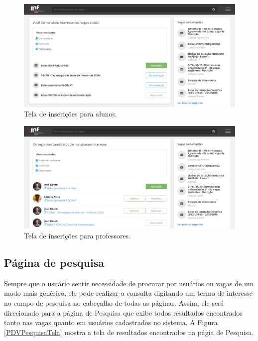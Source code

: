 \begin{figure}[h]
    \caption{Tela de inscrições para alunos.}
       	\begin{center}
            \includegraphics[width=.85\textwidth]{figuras/vaga-inscr.png}
        \end{center}
    \label{telaInscrAluno}
\end{figure}

\begin{figure}[H]
    \caption{Tela de inscrições para professores.}
       	\begin{center}
            \includegraphics[width=.85\textwidth]{figuras/vaga-inscr-2.png}
        \end{center}
    \label{telaInscrProf}
\end{figure}

\subsection{Página de pesquisa}
\label{PDVFunPesquisa}

Sempre que o usuário sentir necessidade de procurar por usuários ou vagas de um modo mais genérico, ele pode realizar a consulta digitando um termo de interesse no campo de pesquisa no cabeçalho de todas as páginas. Assim, ele será direcionado para a página de Pesquisa que exibe todos resultados encontrados tanto nas vagas quanto em usuários cadastrados no sistema. A Figura \ref{PDVPesquisaTela} mostra a tela de resultados encontrados na págia de Pesquisa.

